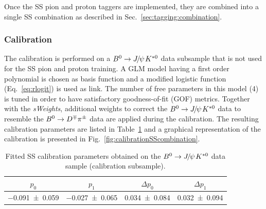 Once the SS pion and proton taggers are implemented, they are combined into
a single SS combination as described in Sec.~\ref{sec:tagging:combination}.

\subsubsection{Calibration}
\label{sec:tagging:SScalib:combo}

The calibration is performed on a $\Bz\to\jpsi\Kstarz$ data subsample that is not used for the SS pion and proton training.
A GLM model having a first order polynomial is chosen as basis function and a
modified logistic function (Eq.~\ref{eq:rlogit}) is used as link. The number of free parameters in this model (4) is tuned in order to have
satisfactory goodness-of-fit (GOF) metrics. Together with the \emph{sWeights},
additional weights to correct the $\Bz\to\jpsi\Kstarz$ data to resemble the $B^0\rightarrow D^\mp\pi^\pm$ data are applied during the calibration. The
resulting calibration parameters are listed in Table~\ref{tab:calibrationSScombination} and a graphical representation of the calibration 
is presented in Fig.~\ref{fig:calibrationSScombination}.
\begin{table}[tbp]
	\centering
	\caption{Fitted SS calibration parameters obtained on the $\Bz\to\jpsi\Kstarz$ data sample (calibration
	subsample).}
	\begin{tabular}{cccc}
		\toprule
		$p_0$ & $p_1$ & $\Delta p_0$ & $\Delta p_1$ \\
		\midrule
		\num{-0.091\pm0.059}  & \num{-0.027\pm0.065} & \num{0.034\pm0.084} &\num{0.032\pm0.094}\\
		\bottomrule
	\end{tabular}
	\label{tab:calibrationSScombination}
\end{table}
